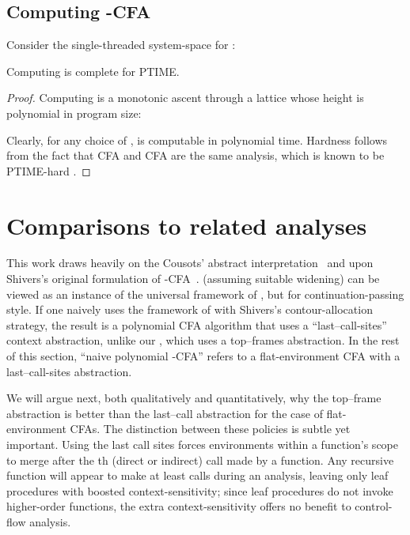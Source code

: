 \subsection{Computing -CFA}

Consider the single-threaded system-space for \nCFA:
\begin{small}\end{small}

\begin{theorem}
  Computing \nCFA{} is complete for PTIME.
\end{theorem}
\begin{proof}
  Computing \nCFA{} is a monotonic ascent through a lattice whose
  height is polynomial in program size:
\begin{small}\end{small}Clearly, for any choice of , \nCFA{} is computable in
polynomial time.
Hardness follows from the fact that CFA and CFA are the
same analysis, which is known to be PTIME-hard
\cite{dvanhorn:VanHorn-Mairson:ICFP07}.
\end{proof}






\section{Comparisons to related analyses}
\label{sec:implementation}
\label{sec:related}

This work draws heavily on the Cousots' abstract
interpretation~\cite{mattmight:Cousot:1977:AI,mattmight:Cousot:1979:Galois} and upon Shivers's 
original formulation of -CFA~\cite{mattmight:Shivers:1991:CFA}.
\nCFA{} (assuming suitable widening) can be viewed as an instance of
the universal framework of \citet{mattmight:Jagannathan:1995:Unified},
but for continuation-passing style.
If one naively uses the framework of
\citet{mattmight:Jagannathan:1995:Unified} with Shivers's \kCFA{}
contour-allocation strategy, the result is a polynomial CFA algorithm
that uses a ``last--call-sites'' context abstraction, unlike our
\nCFA{}, which uses a top--frames abstraction.
In the rest of this section, ``naive polynomial -CFA'' refers to a
flat-environment CFA with a last--call-sites abstraction.


We will argue next, both qualitatively and quantitatively,
why the top--frame abstraction is better than the last--call
abstraction for the case of flat-environment CFAs.
The distinction between these policies is subtle yet
important.
Using the last  call sites forces environments within a function's
scope to merge after the th (direct or indirect) call made by a
function.
Any recursive function will appear to make at least  calls during
an analysis, leaving only leaf procedures with boosted
context-sensitivity; since leaf procedures do not invoke higher-order
functions, the extra context-sensitivity offers no benefit to
control-flow analysis.


